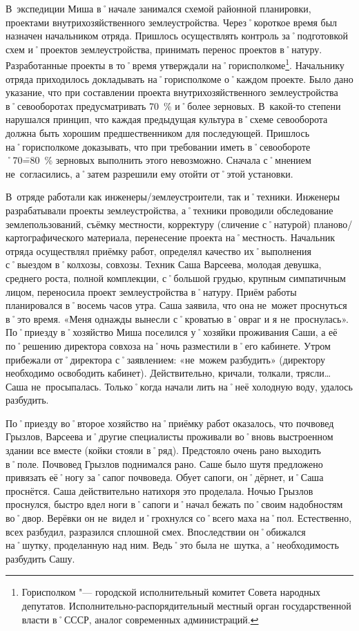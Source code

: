 В~экспедиции Миша в˚начале занимался схемой районной планировки, проектами внутрихозяйственного землеустройства. Через˚короткое время был назначен начальником отряда. Пришлось осуществлять контроль за˚подготовкой схем и˚проектов землеустройства, принимать перенос проектов в˚натуру. Разработанные проекты в то˚время утверждали на˚горисполкоме\footnote{Горисполком "--- городской исполнительный комитет Совета народных депутатов. Исполнительно-распорядительный местный орган государственной власти в˚СССР, аналог современных администраций.}. Начальнику отряда приходилось докладывать на˚горисполкоме о˚каждом проекте. Было дано указание, что при составлении проекта внутрихозяйственного землеустройства в˚севооборотах предусматривать 70~\% и˚более зерновых. В~какой-то степени нарушался принцип, что каждая предыдущая культура в˚схеме севооборота должна быть хорошим предшественником для последующей. Пришлось на˚горисполкоме доказывать, что при требовании иметь в˚севообороте ˚70\==80~\% зерновых выполнить этого невозможно. Сначала с˚мнением не~согласились, а˚затем разрешили ему отойти от˚этой установки.

В~отряде работали как инженеры\-/землеустроители, так и˚техники. Инженеры разрабатывали проекты землеустройства, а˚техники проводили обследование землепользований, съёмку местности, корректуру (сличение с˚натурой) планово\-/картографического материала, перенесение проекта на˚местность. Начальник отряда осуществлял приёмку работ, определял качество их˚выполнения с˚выездом в˚колхозы, совхозы. Техник Саша Варсеева, молодая девушка, среднего роста, полной комплекции, с˚большой грудью, крупным симпатичным лицом, переносила проект землеустройства в˚натуру. Приём работы планировался в˚восемь часов утра. Саша заявила, что она не~может проснуться в˚это время. «Меня однажды вынесли с˚кроватью в˚овраг и я не~проснулась». По˚приезду в˚хозяйство Миша поселился у˚хозяйки проживания Саши, а её по˚решению директора совхоза на˚ночь разместили в˚его кабинете. Утром прибежали от˚директора с˚заявлением: «не~можем разбудить» (директору необходимо освободить кабинет). Действительно, кричали, толкали, трясли… Саша не~просыпалась. Только˚когда начали лить на˚неё холодную воду, удалось разбудить.

По˚приезду во˚второе хозяйство на˚приёмку работ оказалось, что почвовед Грызлов, Варсеева и˚другие специалисты проживали во˚вновь выстроенном здании все вместе (койки стояли в˚ряд). Предстояло очень рано выходить в˚поле. Почвовед Грызлов поднимался рано. Саше было шутя предложено привязать её˚ногу за˚сапог почвоведа. Обует сапоги, он˚дёрнет, и˚Саша проснётся. Саша действительно натихоря это проделала. Ночью Грызлов проснулся, быстро вдел ноги в˚сапоги и˚начал бежать по˚своим надобностям во˚двор. Верёвки он не~видел и˚грохнулся со˚всего маха на˚пол. Естественно, всех разбудил, разразился сплошной смех. Впоследствии он˚обижался на˚шутку, проделанную над ним. Ведь˚это была не~шутка, а˚необходимость разбудить Сашу.

